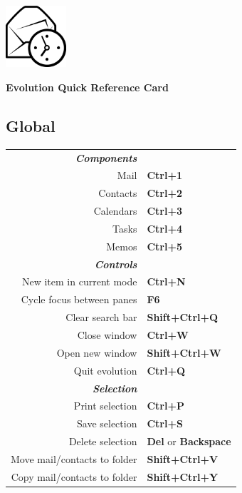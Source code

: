 \documentclass[12pt]{article}
\date {}
\begin{document}
	\begin{landscape}


	\begin{center}
	\begin{minipage}[m]
		{1in}\includegraphics[height=0.9in]{../evolution-logo.eps}\hspace{5mm}
	\end{minipage}
	\hspace{5mm}
	\textbf{\Huge{Evolution Quick Reference Card}}
	\end{center}

	\begin{center}
	\begin{multicols}{2}
	\section*{Global}
	\begin{tabular*}{4in}{rp{1.5in}}
		\textit{\textbf{Components}}		&					\\
		Mail					& \textbf{Ctrl+1}			\\
		Contacts				& \textbf{Ctrl+2}			\\
		Calendars				& \textbf{Ctrl+3}			\\
		Tasks					& \textbf{Ctrl+4}			\\
		\vspace{1.5mm}
		Memos					& \textbf{Ctrl+5}			\\
		\textit{\textbf{Controls}}		&					\\
		New item in current mode		& \textbf{Ctrl+N}			\\
		Cycle focus between panes		& \textbf{F6}				\\
		Clear search bar			& \textbf{Shift+Ctrl+Q}			\\
		Close window				& \textbf{Ctrl+W}			\\
		Open new window				& \textbf{Shift+Ctrl+W}			\\
		\vspace{1.5mm}
		Quit evolution				& \textbf{Ctrl+Q}			\\
		\textit{\textbf{Selection}}		&					\\
		Print selection				& \textbf{Ctrl+P}			\\
		Save selection				& \textbf{Ctrl+S}			\\
		Delete selection			& \textbf{Del} or \textbf{Backspace}	\\
		Move mail/contacts to folder		& \textbf{Shift+Ctrl+V}			\\
		Copy mail/contacts to folder		& \textbf{Shift+Ctrl+Y}			\\
	\end{tabular*}

\end{multicols}
\end{center}
\end{landscape}
\end{document}
